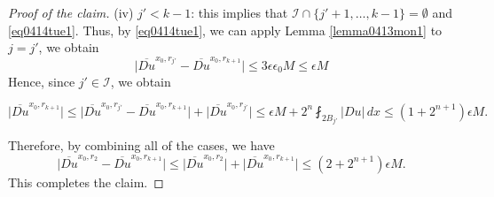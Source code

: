 \documentclass[reqno]{amsart}
\numberwithin{equation}{section}
\theoremstyle{plain}
\theoremstyle{definition}
\theoremstyle{remark}
\providecommand{\set}[1]{\{#1\}}
\providecommand{\abs}[1]{\lvert#1\rvert}
\providecommand{\bigabs}[1]{\bigl\lvert#1\bigr\rvert}
\begin{document}
\begin{proof}[Proof of the claim]
(iv) $j' <k-1$: this implies that $\mathcal{I}\cap \set{  j'+1,\ldots,k-1}=\emptyset$ and \eqref{eq0414tue1}. Thus, by \eqref{eq0414tue1}, we can apply Lemma \ref{lemma0413mon1} to $j=j'$, we obtain
\[
\bigabs{ \overline{Du}^{x_0 ,r_{j'}}  -\overline{Du}^{x_0 ,r_{k+1} }}\leq 3\epsilon\epsilon_0  M \le \epsilon M
\]
Hence, since $j'\in \mathcal{I}$, we obtain

\[
\bigabs{ \overline{Du}^{x_0 ,r_{k+1}}  }\leq \bigabs{ \overline{Du}^{x_0 ,r_{j'}}  -\overline{Du}^{x_0 ,r_{k+1}}}+\bigabs{  \overline{Du}^{x_0 ,r_{j'}}}\leq \epsilon  M+ 2^n \fint_{2B_{j'}} \abs{Du} \,dx \leq (1+2^{n+1})\epsilon M.
\]

Therefore, by combining all of the cases, we have
\[
 \bigabs{ \overline{Du}^{x_0 ,r_{2}}  -\overline{Du}^{x_0 ,r_{k+1}}}\leq \bigabs{  \overline{Du}^{x_0 ,r_{2}}}+\bigabs{  \overline{Du}^{x_0 ,r_{k+1}}}\leq   (2+2^{n+1})\epsilon M.
\]
This completes the claim.
\end{proof}
\end{document}
